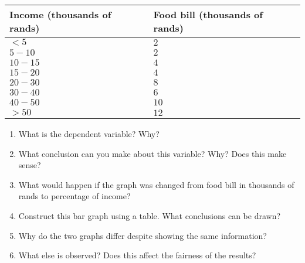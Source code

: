 {\begin{center}
\begin{tabular}{|l|l|}
\hline
Income (thousands of rands) & Food bill (thousands of rands) \\ 
\hline
 $<5$  & $2$  \\
 $5-10$  & $2$  \\
 $10-15$ & $4$  \\
 $15-20$ & $4$  \\
 $20-30$ & $8$  \\
 $30-40$ & $6$  \\
 $40-50$ & $10$ \\
 $>50$ & $12$ \\
\hline
\end{tabular}
\end{center}

\begin{enumerate}
\item What is the dependent variable? Why?
\item What conclusion can you make about this variable? Why? Does this make sense? 
\item What would happen if the graph was changed from food bill in thousands of rands to percentage of income?
\item Construct this bar graph using a table. What conclusions can be drawn?
\item Why do the two graphs differ despite showing the same information?
\item What else is observed? Does this affect the fairness of the results? 
\end{enumerate}
}
